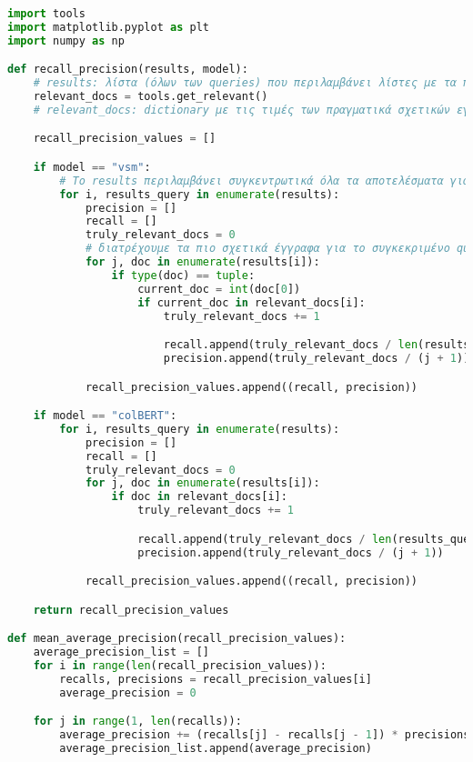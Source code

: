 \begin{lstlisting}[language=Python]
import tools
import matplotlib.pyplot as plt
import numpy as np

def recall_precision(results, model):
    # results: λίστα (όλων των queries) που περιλαμβάνει λίστες με τα πιο σχετικά έγγραφα, όπως υπολογίστηκαν από το cosine similarity
    relevant_docs = tools.get_relevant()
    # relevant_docs: dictionary με τις τιμές των πραγματικά σχετικών εγγράφων του Relevent_20

    recall_precision_values = []

    if model == "vsm":
        # Το results περιλαμβάνει συγκεντρωτικά όλα τα αποτελέσματα για κάθε query. Διατρέχουμε το κάθε query μεμονομένα...
        for i, results_query in enumerate(results):
            precision = []
            recall = []
            truly_relevant_docs = 0
            # διατρέχουμε τα πιο σχετικά έγγραφα για το συγκεκριμένο query...
            for j, doc in enumerate(results[i]):
                if type(doc) == tuple:
                    current_doc = int(doc[0])
                    if current_doc in relevant_docs[i]:
                        truly_relevant_docs += 1

                        recall.append(truly_relevant_docs / len(results_query))
                        precision.append(truly_relevant_docs / (j + 1))

            recall_precision_values.append((recall, precision))

    if model == "colBERT":
        for i, results_query in enumerate(results):
            precision = []
            recall = []
            truly_relevant_docs = 0
            for j, doc in enumerate(results[i]):
                if doc in relevant_docs[i]:
                    truly_relevant_docs += 1

                    recall.append(truly_relevant_docs / len(results_query))
                    precision.append(truly_relevant_docs / (j + 1))

            recall_precision_values.append((recall, precision))

    return recall_precision_values

def mean_average_precision(recall_precision_values):
    average_precision_list = []
    for i in range(len(recall_precision_values)):
        recalls, precisions = recall_precision_values[i]
        average_precision = 0

    for j in range(1, len(recalls)):
        average_precision += (recalls[j] - recalls[j - 1]) * precisions[j]
        average_precision_list.append(average_precision)


\end{lstlisting}
